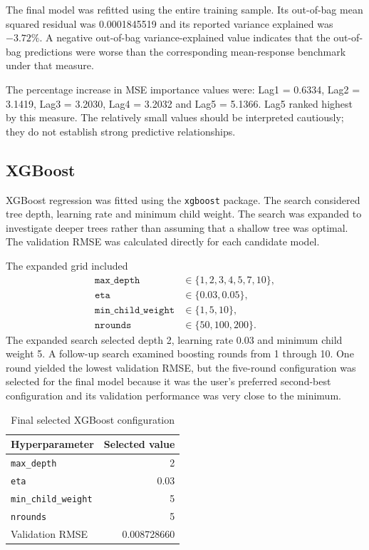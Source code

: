 \documentclass[10pt,a4paper]{article}
\begin{document}
The final model was refitted using the entire training sample. Its out-of-bag mean squared residual was 0.0001845519 and its reported variance explained was $-3.72\%$. A negative out-of-bag variance-explained value indicates that the out-of-bag predictions were worse than the corresponding mean-response benchmark under that measure.

The percentage increase in MSE importance values were: Lag1 = 0.6334, Lag2 = 3.1419, Lag3 = 3.2030, Lag4 = 3.2032 and Lag5 = 5.1366. Lag5 ranked highest by this measure. The relatively small values should be interpreted cautiously; they do not establish strong predictive relationships.

\subsection{XGBoost}

XGBoost regression was fitted using the \texttt{xgboost} package. The search considered tree depth, learning rate and minimum child weight. The search was expanded to investigate deeper trees rather than assuming that a shallow tree was optimal. The validation RMSE was calculated directly for each candidate model.

The expanded grid included
\begin{align*}
  \texttt{max\_depth} &\in\{1,2,3,4,5,7,10\},\\
  \texttt{eta} &\in\{0.03,0.05\},\\
  \texttt{min\_child\_weight} &\in\{1,5,10\},\\
  \texttt{nrounds} &\in\{50,100,200\}.
\end{align*}
The expanded search selected depth 2, learning rate 0.03 and minimum child weight 5. A follow-up search examined boosting rounds from 1 through 10. One round yielded the lowest validation RMSE, but the five-round configuration was selected for the final model because it was the user's preferred second-best configuration and its validation performance was very close to the minimum.

\begin{table}[H]
\centering
\caption{Final selected XGBoost configuration}
\begin{tabular}{lr}
\toprule
Hyperparameter & Selected value \\
\midrule
\texttt{max\_depth} & 2 \\
\texttt{eta} & 0.03 \\
\texttt{min\_child\_weight} & 5 \\
\texttt{nrounds} & 5 \\
Validation RMSE & 0.008728660 \\
\bottomrule
\end{tabular}
\label{tab:xgb_tuning}
\end{table}
\end{document}
